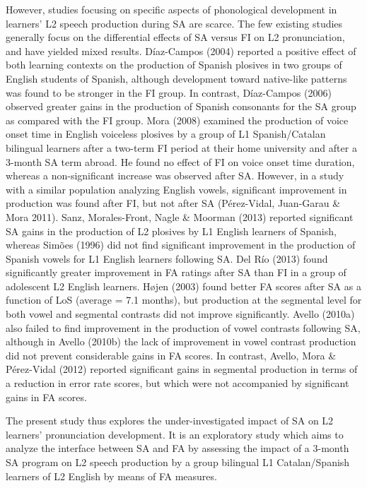 \documentclass[12pt]{article}
\newenvironment{styleStandard}{\setlength\leftskip{0cm}\setlength\rightskip{0cm plus 1fil}\setlength\parindent{0cm}\setlength\parfillskip{0pt plus 1fil}\setlength\parskip{0in plus 1pt}\writerlistparindent\writerlistleftskip\leavevmode\normalfont\normalsize\writerlistlabel\ignorespaces}{\unskip\vspace{0.111in plus 0.0111in}\par}
\newcommand\writerlistleftskip{}
\newcommand\writerlistparindent{}
\newcommand\writerlistlabel{}
\begin{document}
\begin{styleStandard}
However, studies focusing on specific aspects of phonological development in learners’ L2 speech production during SA are scarce. The few existing studies generally focus on the differential effects of SA versus FI on L2 pronunciation, and have yielded mixed results. Díaz-Campos (2004) reported a positive effect of both learning contexts on the production of Spanish plosives in two groups of English students of Spanish, although development toward native-like patterns was found to be stronger in the FI group. In contrast, Díaz-Campos (2006) observed greater gains in the production of Spanish consonants for the SA group as compared with the FI group. Mora (2008) examined the production of voice onset time in English voiceless plosives by a group of L1 Spanish/Catalan bilingual learners after a two-term FI period at their home university and after a 3-month SA term abroad. He found no effect of FI on voice onset time duration, whereas a non-significant increase was observed after SA. However, in a study with a similar population analyzing English vowels, significant improvement in production was found after FI, but not after SA (Pérez-Vidal, Juan-Garau \& Mora 2011). Sanz, Morales-Front, Nagle \& Moorman (2013) reported significant SA gains in the production of L2 plosives by L1 English learners of Spanish, whereas Simões (1996) did not find significant improvement in the production of Spanish vowels for L1 English learners following SA. Del Río (2013) found significantly greater improvement in FA ratings after SA than FI in a group of adolescent L2 English learners. Højen (2003) found better FA scores after SA as a function of LoS (average = 7.1 months), but production at the segmental level for both vowel and segmental contrasts did not improve significantly. Avello (2010a) also failed to find improvement in the production of vowel contrasts following SA, although in Avello (2010b) the lack of improvement in vowel contrast production did not prevent considerable gains in FA scores. In contrast, Avello, Mora \& Pérez-Vidal (2012) reported significant gains in segmental production in terms of a reduction in error rate scores, but which were not accompanied by significant gains in FA scores.
\end{styleStandard}

\begin{styleStandard}
The present study thus explores the under-investigated impact of SA on L2 learners’ pronunciation development. It is an exploratory study which aims to analyze the interface between SA and FA by assessing the impact of a 3-month SA program on L2 speech production by a group bilingual L1 Catalan/Spanish learners of L2 English by means of FA measures.
\end{styleStandard}
\end{document}
